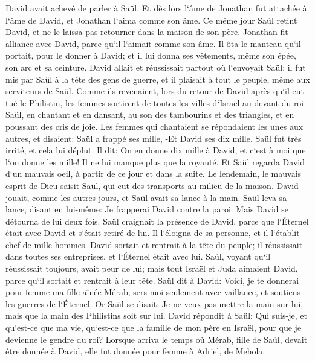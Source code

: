 \verse David avait achevé de parler à Saül. Et dès lors l`âme de Jonathan fut attachée à l`âme de David, et Jonathan l`aima comme son âme. 
\verse Ce même jour Saül retint David, et ne le laissa pas retourner dans la maison de son père. 
\verse Jonathan fit alliance avec David, parce qu`il l`aimait comme son âme. 
\verse Il ôta le manteau qu`il portait, pour le donner à David; et il lui donna ses vêtements, même son épée, son arc et sa ceinture. 
\verse David allait et réussissait partout où l`envoyait Saül; il fut mis par Saül à la tête des gens de guerre, et il plaisait à tout le peuple, même aux serviteurs de Saül. 
\verse Comme ils revenaient, lors du retour de David après qu`il eut tué le Philistin, les femmes sortirent de toutes les villes d`Israël au-devant du roi Saül, en chantant et en dansant, au son des tambourins et des triangles, et en poussant des cris de joie. 
\verse Les femmes qui chantaient se répondaient les unes aux autres, et disaient: Saül a frappé ses mille, -Et David ses dix mille. 
\verse Saül fut très irrité, et cela lui déplut. Il dit: On en donne dix mille à David, et c`est à moi que l`on donne les mille! Il ne lui manque plus que la royauté. 
\verse Et Saül regarda David d`un mauvais oeil, à partir de ce jour et dans la suite. 
\verse Le lendemain, le mauvais esprit de Dieu saisit Saül, qui eut des transports au milieu de la maison. David jouait, comme les autres jours, et Saül avait sa lance à la main. 
\verse Saül leva sa lance, disant en lui-même: Je frapperai David contre la paroi. Mais David se détourna de lui deux fois. 
\verse Saül craignait la présence de David, parce que l`Éternel était avec David et s`était retiré de lui. 
\verse Il l`éloigna de sa personne, et il l`établit chef de mille hommes. David sortait et rentrait à la tête du peuple; 
\verse il réussissait dans toutes ses entreprises, et l`Éternel était avec lui. 
\verse Saül, voyant qu`il réussissait toujours, avait peur de lui; 
\verse mais tout Israël et Juda aimaient David, parce qu`il sortait et rentrait à leur tête. 
\verse Saül dit à David: Voici, je te donnerai pour femme ma fille aînée Mérab; sers-moi seulement avec vaillance, et soutiens les guerres de l`Éternel. Or Saül se disait: Je ne veux pas mettre la main sur lui, mais que la main des Philistins soit sur lui. 
\verse David répondit à Saül: Qui suis-je, et qu`est-ce que ma vie, qu`est-ce que la famille de mon père en Israël, pour que je devienne le gendre du roi? 
\verse Lorsque arriva le temps où Mérab, fille de Saül, devait être donnée à David, elle fut donnée pour femme à Adriel, de Mehola. 
